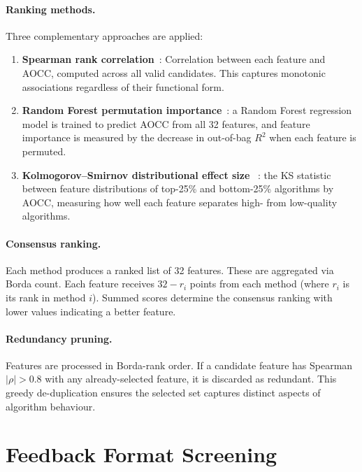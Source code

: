 \paragraph{Ranking methods.}
Three complementary approaches are applied:
\begin{enumerate}
  \item \textbf{Spearman rank correlation}~\cite{spearman1904proof}: Correlation between each feature and AOCC, computed across all valid candidates. This captures monotonic associations regardless of their functional form.
  \item \textbf{Random Forest permutation importance}~\cite{breiman2001randomforests}: a Random Forest regression model is trained to predict AOCC from all 32 features, and feature importance is measured by the decrease in out-of-bag $R^2$ when each feature is permuted.
  \item \textbf{Kolmogorov--Smirnov distributional effect size} ~\cite{kolmogorov1933}: the KS statistic between feature distributions of top-25\% and bottom-25\% algorithms by AOCC, measuring how well each feature separates high- from low-quality algorithms.
\end{enumerate}

\paragraph{Consensus ranking.}
Each method produces a ranked list of 32 features. These are aggregated via Borda count. Each feature receives $32 - r_i$ points from each method (where $r_i$ is its rank in method $i$). Summed scores determine the consensus ranking with lower values indicating a better feature.

\paragraph{Redundancy pruning.}
Features are processed in Borda-rank order. If a candidate feature has Spearman $|\rho| > 0.8$ with any already-selected feature, it is discarded as redundant. This greedy de-duplication ensures the selected set captures distinct aspects of algorithm behaviour.

\section{Feedback Format Screening}
\label{sec:meth-feedback-screening}

